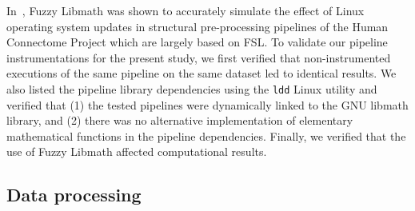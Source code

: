 \documentclass[11pt,onecolumn]{article}
\begin{document}


In~\cite{salari2021accurate}, Fuzzy Libmath was shown to accurately
simulate the effect of Linux operating system updates in structural
pre-processing pipelines of the Human Connectome Project which are largely based on FSL.
To validate our pipeline instrumentations for the present study, we first verified that non-instrumented
executions of the same pipeline on the same dataset led to identical
results. We also listed the pipeline
library dependencies using the \texttt{ldd} Linux utility and verified that
(1) the tested pipelines were dynamically linked to the GNU libmath library, and
(2) there was no alternative implementation of elementary mathematical functions in the pipeline dependencies.
Finally, we verified that the use of Fuzzy Libmath affected computational results.

\subsection{Data processing}
\end{document}

